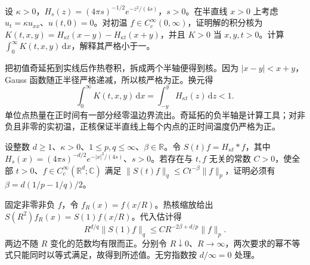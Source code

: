 \begin{exercise}\label{b2:ex:12-half-line}
设 \(\kappa>0\)，\(H_s(z)=(4\pi s)^{-1/2}e^{-z^2/(4s)}\)，\(s>0\)。在半直线 \(x>0\) 上考虑 \(u_t=\kappa u_{xx}\)、\(u(t,0)=0\)。对初温 \(f\in C_c^\infty(0,\infty)\)，证明解的积分核为 \(K(t,x,y)=H_{\kappa t}(x-y)-H_{\kappa t}(x+y)\)，并且 \(K>0\) 当 \(x,y,t>0\)。计算 \(\int_0^\infty K(t,x,y)\,\mathrm{d}x\)，解释其严格小于一。
\end{exercise}
\begin{solution}
把初值奇延拓到实线后作热卷积，拆成两个半轴便得到核。因为 \(|x-y|<x+y\)，Gauss 函数随正半径严格递减，所以核严格为正。换元得
\[
 \int_0^\infty K(t,x,y)\,\mathrm{d}x
 =\int_{-y}^{y}H_{\kappa t}(z)\,\mathrm{d}z<1.
\]
单位点热量在正时间有一部分经零温边界流出。奇延拓的负半轴是计算工具；对非负且非零的实初温，正核保证半直线上每个内点的正时间温度仍严格为正。
\end{solution}

\begin{exercise}\label{b2:ex:12-scaling-exponent}
设整数 \(d\geq1\)、\(\kappa>0\)、\(1\leq p,q\leq\infty\)、\(\beta\in\mathbb R\)。令 \(S(t)f=H_{\kappa t}*f\)，其中 \(H_s(x)=(4\pi s)^{-d/2}e^{-|x|^2/(4s)}\)、\(s>0\)。若存在与 \(t,f\) 无关的常数 \(C>0\)，使全部 \(t>0\)、\(f\in C_c^\infty(\mathbb R^d;\mathbb C)\) 满足 \(\|S(t)f\|_q\leq Ct^{-\beta}\|f\|_p\)，证明必须有 \(\beta=d(1/p-1/q)/2\)。
\end{exercise}
\begin{solution}
固定非零非负 \(f\)，令 \(f_R(x)=f(x/R)\)。热核缩放给出 \(S(R^2)f_R(x)=S(1)f(x/R)\)。代入估计得
\[
 R^{d/q}\|S(1)f\|_q\leq C R^{-2\beta+d/p}\|f\|_p.
\]
两边不随 \(R\) 变化的范数均有限而正。分别令 \(R\downarrow0\)、\(R\to\infty\)，两次要求的幂不等式只能同时以等式满足，故得到所述值。无穷指数按 \(d/\infty=0\) 处理。
\end{solution}

